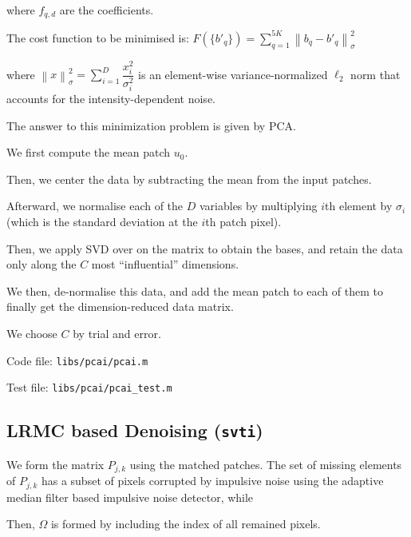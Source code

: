 \documentclass[fleqn, 11pt]{article}
\newcommand\norm[1]{\left\lVert#1\right\rVert}
\begin{document}
 where $f_{q,d}$ are the coefficients. 

\medskip

The cost function to be minimised is: $F(\{b'_q\}) = \displaystyle \sum_{q=1}^{5K} \norm{b_q - b'_q}_{\sigma}^2  $

where $\norm{x}_{\sigma}^2 = \displaystyle \sum_{i=1}^D \dfrac{x_i^2}{\sigma_i^2} $ 
is an element-wise variance-normalized
$\ell_2$ norm that accounts for the intensity-dependent noise.

\medskip

The answer to this minimization problem is given by PCA.

\bigskip

We first compute the mean patch $u_0$.

Then, we center the data by subtracting the mean from the input patches. 

Afterward, we normalise each of the $D$ variables by multiplying $i$th element by 
$\sigma_i$ (which is the standard deviation at the $i$th patch pixel). 

\medskip

Then, we apply SVD over on the matrix to obtain the bases, and 
retain the data only along the $C$ 
most ``influential'' dimensions. 

\medskip

We then, de-normalise this data, and add the mean patch 
to each of them to finally get the dimension-reduced data matrix. 

We choose $C$ by trial and error.

\medskip

Code file: \texttt{libs/pcai/pcai.m}

Test file: \texttt{libs/pcai/pcai\_test.m}

\bigskip

\newpage 

\subsection*{LRMC based Denoising (\texttt{svti})}

We form the matrix $P_{j,k}$ using the matched patches. 
The set of missing elements of $P_{j,k}$ has a subset of pixels 
corrupted by impulsive noise using 
the adaptive median filter based impulsive noise detector, while
 
Then, $\Omega$ is formed by including 
the index of all remained pixels. 

\medskip
\end{document}

